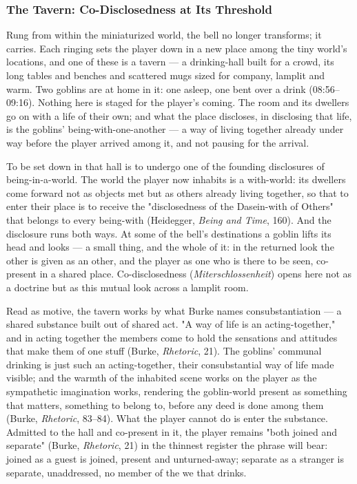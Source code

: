 \documentclass{article}
\begin{document}
\subsubsection*{The Tavern: Co-Disclosedness at Its Threshold}

Rung from within the miniaturized world, the bell no longer transforms; it carries. Each ringing sets the player down in a new place among the tiny world's locations, and one of these is a tavern — a drinking-hall built for a crowd, its long tables and benches and scattered mugs sized for company, lamplit and warm. Two goblins are at home in it: one asleep, one bent over a drink (08:56–09:16). Nothing here is staged for the player's coming. The room and its dwellers go on with a life of their own; and what the place discloses, in disclosing that life, is the goblins' being-with-one-another — a way of living together already under way before the player arrived among it, and not pausing for the arrival.

To be set down in that hall is to undergo one of the founding disclosures of being-in-a-world. The world the player now inhabits is a with-world: its dwellers come forward not as objects met but as others already living together, so that to enter their place is to receive the "disclosedness of the Dasein-with of Others" that belongs to every being-with (Heidegger, \textit{Being and Time}, 160). And the disclosure runs both ways. At some of the bell's destinations a goblin lifts its head and looks — a small thing, and the whole of it: in the returned look the other is given as an other, and the player as one who is there to be seen, co-present in a shared place. Co-disclosedness (\textit{Miterschlossenheit}) opens here not as a doctrine but as this mutual look across a lamplit room.

Read as motive, the tavern works by what Burke names consubstantiation — a shared substance built out of shared act. "A way of life is an acting-together," and in acting together the members come to hold the sensations and attitudes that make them of one stuff (Burke, \textit{Rhetoric}, 21). The goblins' communal drinking is just such an acting-together, their consubstantial way of life made visible; and the warmth of the inhabited scene works on the player as the sympathetic imagination works, rendering the goblin-world present as something that matters, something to belong to, before any deed is done among them (Burke, \textit{Rhetoric}, 83–84). What the player cannot do is enter the substance. Admitted to the hall and co-present in it, the player remains "both joined and separate" (Burke, \textit{Rhetoric}, 21) in the thinnest register the phrase will bear: joined as a guest is joined, present and unturned-away; separate as a stranger is separate, unaddressed, no member of the we that drinks.
\end{document}
